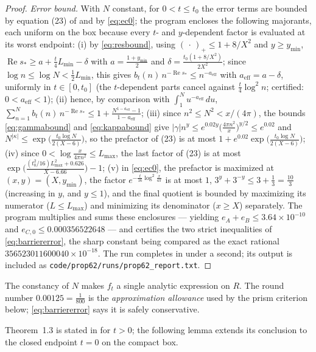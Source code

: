 \documentclass[11pt]{article}
\theoremstyle{definition}
\DeclareMathOperator{\Rea}{Re}
\begin{document}
\begin{proof}
\emph{Error bound.} With $N$ constant, for $0<t\le t_0$ the error
terms are bounded by equation (23) of \cite{Polymath} and by
\eqref{eq:ec0}; the program encloses the following majorants, each
uniform on the box because every $t$- and $y$-dependent factor is
evaluated at its worst endpoint:
(i) by \eqref{eq:resbound}, using $(\,\cdot\,)_+\le1+8/X^2$ and
$y\ge y_{\min}$,
$\Rea s_*\ge a+\frac t4L_{\min}-\delta$ with
$a=\frac{1+y_{\min}}2$ and
$\delta=\frac{t_0(1+8/X^2)}{2X^2}$; since
$\log n\le\log N<\frac12L_{\min}$, this gives
$b_t(n)\,n^{-\Rea s_*}\le n^{-a_{\mathrm{eff}}}$ with
$a_{\mathrm{eff}}=a-\delta$, uniformly in $t\in[0,t_0]$ (the
$t$-dependent parts cancel against $\frac t4\log^2n$; certified:
$0<a_{\mathrm{eff}}<1$);
(ii) hence, by comparison with $\int_1^Nu^{-a_{\mathrm{eff}}}\,du$,
$\sum_{n=1}^{N}b_t(n)\,n^{-\Rea s_*}\le
1+\frac{N^{1-a_{\mathrm{eff}}}-1}{1-a_{\mathrm{eff}}}$;
(iii) since $n^2\le N^2<x/(4\pi)$, the bounds \eqref{eq:gammabound}
and \eqref{eq:kappabound} give
$|\gamma|n^y\le e^{0.02y}\bigl(\frac{4\pi n^2}x\bigr)^{y/2}\le
e^{0.02}$ and
$N^{|\kappa|}\le\exp\bigl(\frac{t_0\log N}{2(X-6)}\bigr)$, so the
prefactor of (23) is at most
$1+e^{0.02}\exp\bigl(\frac{t_0\log N}{2(X-6)}\bigr)$;
(iv) since $0<\log\frac x{4\pi n^2}\le L_{\max}$, the last factor
of (23) is at most
$\exp\bigl(\frac{(t_0^2/16)L_{\max}^2+0.626}{X-6.66}\bigr)-1$;
(v) in \eqref{eq:ec0}, the prefactor is maximized at
$(x,y)=(X,y_{\min})$, the factor $e^{-\frac t{16}\log^2\frac x{4\pi}}$
is at most $1$, $3^y+3^{-y}\le3+\frac13=\frac{10}3$ (increasing in
$y$, and $y\le1$), and the final quotient is bounded by maximizing
its numerator ($L\le L_{\max}$) and minimizing its denominator
($x\ge X$) separately.
The program multiplies and sums these enclosures --- yielding
$e_A+e_B\le3.64\times10^{-10}$ and
$e_{C,0}\le0.000356522648$ --- and certifies the two strict
inequalities of \eqref{eq:barriererror}, the sharp constant being
compared as the exact rational $356523011600040\times10^{-18}$.
The run completes in under a second; its output is included as
\texttt{code/prop62/runs/prop62\_report.txt}.
\end{proof}

The constancy of $N$ makes $f_t$ a single analytic
expression on $R$. The round number $0.00125=\frac1{800}$ is the
\emph{approximation allowance} used by the prism criterion below;
\eqref{eq:barriererror} says it is safely conservative.

Theorem~1.3 is stated in \cite{Polymath} for $t>0$; the following
lemma extends its conclusion to the closed endpoint $t=0$ on the
compact box.
\end{document}
